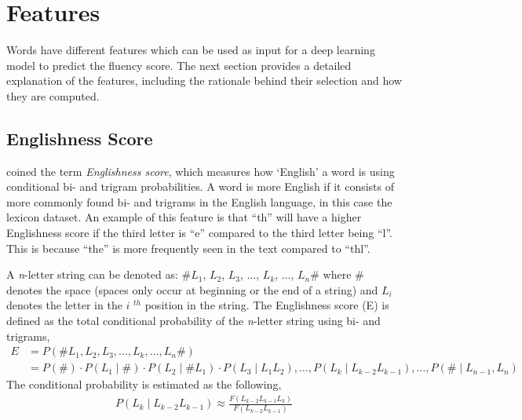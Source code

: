 \documentclass[a4paper,11pt]{report}
\begin{document}
\section{Features}
Words have different features which can be used as input for a deep learning model to predict the fluency score. The next section provides a detailed explanation of the features, including the rationale behind their selection and how they are computed.

\subsection{Englishness Score}
 coined the term \textit{Englishness score}, which measures how `English' a word is using conditional bi- and trigram probabilities. A word is more English if it consists of more commonly found bi- and trigrams in the English language, in this case the lexicon dataset. An example of this feature is that ``th'' will have a higher Englishness score if the third letter is ``e'' compared to the third letter being ``l''. This is because ``the'' is more frequently seen in the text compared to ``thl''.

A \textit{n}-letter string can be denoted as: \#$L_1$, $L_2$, $L_3$, ..., $L_k$, ..., $L_n$\# where \# denotes the space (spaces only occur at beginning or the end of a string) and $L_i$ denotes the letter in the $\textit{i }^{th}$ position in the string. The Englishness score (E) is defined as the total conditional probability of the \textit{n}-letter string using bi- and trigrams, 
\begin{align}
E &= P(\# L_1, L_2, L_3, \ldots, L_k, \ldots, L_n \#) \nonumber \\
  &= P(\#) \cdot P(L_1 \mid \#) \cdot P(L_2 \mid \# L_1) \cdot P(L_3 \mid L_1 L_2), \ldots , P(L_k \mid L_{k-2} L_{k-1}), \ldots, P(\# \mid L_{n-1}, L_n)
\label{eq:equation1}
\end{align}
The conditional probability is estimated as the following, 
\begin{align}
P(L_k \mid L_{k-2} L_{k-1}) \approx \frac{F(L_{k-2}L_{k-1}L_k)}{F(L_{k-2}L_{k-1})}
\label{eq:equation2}
\end{align}
\end{document}
